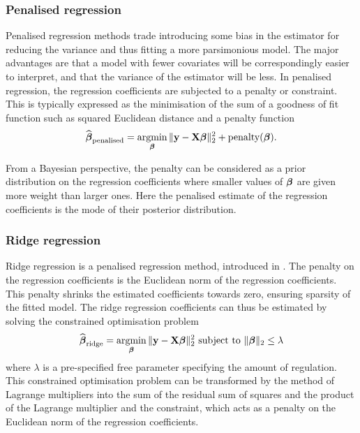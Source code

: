 \subsubsection{Penalised regression}
Penalised regression methods trade introducing some bias in the estimator for reducing the variance and thus
fitting a more parsimonious model. The major advantages are that a model with fewer covariates will be
correspondingly easier to interpret, and that the variance of the estimator will be less. In penalised
regression, the regression coefficients are subjected to a penalty or constraint. This is typically
expressed as the minimisation of the sum of a goodness of fit function such as squared Euclidean distance
and a penalty function
$$
\widehat{\vbeta}_{\text{penalised}} = \argmin_\vbeta \|\vy - \mX \vbeta\|_2^2 + \text{penalty}(\vbeta).
$$

From a Bayesian perspective, the penalty can be considered as a prior distribution on the regression 
coefficients where smaller values of ${\boldsymbol \beta}$ are given more weight than larger ones. Here the penalised
estimate of the regression coefficients is the mode of their posterior distribution.

\subsubsection{Ridge regression}
Ridge regression is a penalised regression method, introduced in \cite{Hoerl1970}. The penalty on the
regression coefficients is the Euclidean norm of the regression coefficients. This penalty shrinks the
estimated coefficients towards zero, ensuring sparsity of the fitted model. The ridge regression coefficients
can thus be estimated by solving the constrained optimisation problem
$$
\widehat{\vbeta}_{\text{ridge}} = \argmin_\vbeta \|\vy - \mX \vbeta\|_2^2 \text{ subject to } \|\vbeta\|_2 \leq \lambda
$$
where $\lambda$ is a pre-specified free parameter specifying the amount of regulation. This constrained
optimisation problem can be transformed by the method of Lagrange multipliers into the sum of the
residual sum of squares and the product of the Lagrange multiplier and the constraint, which acts as a
penalty on the Euclidean norm of the regression coefficients.


